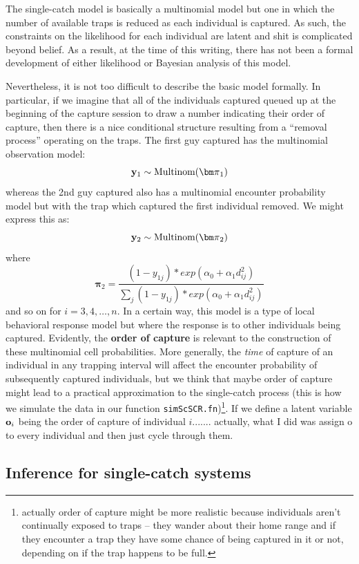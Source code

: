 The single-catch model is basically a multinomial model but one in
which the number of available traps is reduced as each individual is
captured. As such, the constraints on the likelihood for each
individual are latent and shit is complicated beyond belief.  As a
result, at the time of this writing, there has not been a formal
development of either likelihood or Bayesian analysis of this model.

Nevertheless, it is not too difficult to describe the basic model
formally. In particular, if we imagine that all of the individuals
captured queued up at the beginning of the capture session to draw a
number indicating their order of capture, then there is a nice conditional structure
resulting from a ``removal process'' operating on the traps.  The
first guy captured has the multinomial observation model:
\[
{\bf y}_{1} \sim \mbox{Multinom}({\bm \pi}_{1})
\]
whereas the 2nd guy captured also has a multinomial encounter
probability model but with the trap which captured the first
individual removed. We might express this as:
\[
{\bf y}_{2} \sim \mbox{Multinom}({\bm \pi}_{2})
\]
where
\[
 {\bm \pi}_{2}  = \frac{ (1-y_{1j}) *exp( \alpha_{0} + \alpha_{1}   d_{ij}^{2}) }
{ \sum_{j} (1-y_{1j}) *exp( \alpha_{0} + \alpha_{1}   d_{ij}^{2}) }
\]
and so on for $i=3,4,\ldots,n$.
 In a certain way, this model is a type of local behavioral
response model but where the response is to other individuals being
captured.  
Evidently, the {\bf order of capture} is relevant to the
construction of these multinomial cell probabilities. More generally,
the {\it time} of capture of an individual in any trapping interval
will affect the encounter probability of subsequently captured
individuals, but we think that maybe order of capture might lead to a
practical approximation to the single-catch process (this is how we
simulate the data in our function \mbox{\tt simScSCR.fn})\footnote{actually order of
  capture might be more realistic because individuals aren't
  continually exposed to traps -- they wander about their home range
  and if they encounter a trap they have some chance of being captured
  in it or not, depending on if the trap happens to be full. }.  If we
define a latent variable ${\bf o}_{i}$ being the order of capture of
individual $i$....... actually, what I did was assign o to every
individual and then just cycle through them.


\subsection{Inference for single-catch systems}

